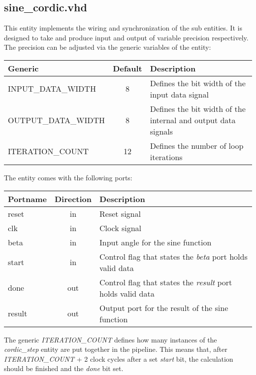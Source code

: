 \subsection{sine\_cordic.vhd}

This entity implements the wiring and synchronization of the sub entities. It is designed to take and produce input and output of variable precision respectively. The precision can be adjusted via the generic variables of the entity:

\begin{center}
	\begin{tabular}{ | l | c | l | }
		\hline
		\textbf{Generic} & \textbf{Default} & \textbf{Description} \\
		\hline
		INPUT\_DATA\_WIDTH & 8 & Defines the bit width of the input data signal \\
		OUTPUT\_DATA\_WIDTH & 8 & Defines the bit width of the internal and output data signals \\
		ITERATION\_COUNT & 12 & Defines the number of loop iterations \\
		\hline
	\end{tabular} 
\end{center}

The entity comes with the following ports:

\begin{center}
	\begin{tabular}{ | l | c | l | }
		\hline
		\textbf{Portname} & \textbf{Direction} & \textbf{Description} \\
		\hline
		reset & in & Reset signal \\
		clk & in  & Clock signal \\
		beta & in  & Input angle for the sine function \\
		start & in & Control flag that states the \textit{beta} port holds valid data \\
		done & out & Control flag that states the \textit{result} port holds valid data \\
		result & out & Output port for the result of the sine function \\
		\hline
	\end{tabular} 
\end{center}

The generic \textit{ITERATION\_COUNT} defines how many instances of the \textit{cordic\_step} entity are put together in the pipeline. This means that, after \textit{ITERATION\_COUNT} + 2 clock cycles after a set \textit{start} bit, the calculation should be finished and the \textit{done} bit set. 
